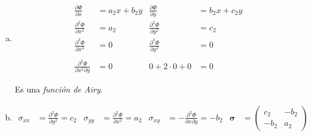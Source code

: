 \documentclass[a4paper,10pt,twoside,final,spanish]{article}
\begin{document}
\dotfill

\begin{enumerate}[a.]
\item

\begin{align*}
\frac{\partial\Phi}{\partial x} &= a_{2}x+b_{2}y
& \frac{\partial\Phi}{\partial y} &= b_{2}x+c_{2}y \\
\frac{\partial^{2}\Phi}{\partial x^{2}} &= a_{2}
& \frac{\partial^{2}\Phi}{\partial y^{2}} &= c_{2} \\
\frac{\partial^{3}\Phi}{\partial x^{3}} &= 0
& \frac{\partial^{3}\Phi}{\partial y^{3}} &= 0 \\ \\
\frac{\partial^{3}\Phi}{\partial x^{2}\partial y} &= 0
& 0+2\cdot 0+0 &= 0
\end{align*}

Es una \textit{función de Airy}.

\item 

\begin{align*}
\sigma_{xx} &= \frac{\partial^{2}\Phi}{\partial y^{2}}=c_{2} &
\sigma_{yy} &= \frac{\partial^{2}\Phi}{\partial x^{2}}=a_{2} &
\sigma_{xy} &= -\frac{\partial^{2}\Phi}{\partial x \partial y}=-b_{2} &
\mathbf{\sigma} &= \begin{pmatrix}
c_{2}  & -b_{2} \\
-b_{2} & a_{2}
\end{pmatrix}
\end{align*}


\end{enumerate}
\end{document}
